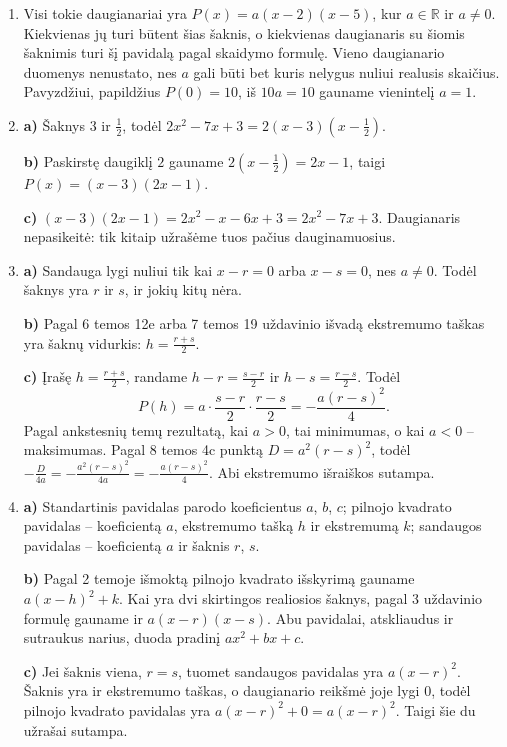 \documentclass[12pt,a4paper]{article}
\begin{document}
\begin{enumerate}
\textbf{c)} Įrašius $-1$ ar $3$ vienas dauginamasis tampa nuliu; $P(0)=-6$. Kiekvienas sąlygas tenkinantis daugianaris turi a dalies pavidalą, o iš $P(0)$ gauname tik vieną galimą reikšmę $a=2$, todėl kito daugianario nėra.
\item Visi tokie daugianariai yra $P(x)=a(x-2)(x-5)$, kur $a\in\mathbb R$ ir $a\ne0$. Kiekvienas jų turi būtent šias šaknis, o kiekvienas daugianaris su šiomis šaknimis turi šį pavidalą pagal skaidymo formulę. Vieno daugianario duomenys nenustato, nes $a$ gali būti bet kuris nelygus nuliui realusis skaičius. Pavyzdžiui, papildžius $P(0)=10$, iš $10a=10$ gauname vienintelį $a=1$.
\item \textbf{a)} Šaknys $3$ ir $\frac{1}{2}$, todėl $2x^2-7x+3=2(x-3)\left(x-\frac{1}{2}\right)$.

\textbf{b)} Paskirstę daugiklį $2$ gauname $2\left(x-\frac{1}{2}\right)=2x-1$, taigi $P(x)=(x-3)(2x-1)$.

\textbf{c)} $(x-3)(2x-1)=2x^2-x-6x+3=2x^2-7x+3$. Daugianaris nepasikeitė: tik kitaip užrašėme tuos pačius dauginamuosius.
\item \textbf{a)} Sandauga lygi nuliui tik kai $x-r=0$ arba $x-s=0$, nes $a\ne0$. Todėl šaknys yra $r$ ir $s$, ir jokių kitų nėra.

\textbf{b)} Pagal 6 temos 12e arba 7 temos 19 uždavinio išvadą ekstremumo taškas yra šaknų vidurkis: $h=\frac{r+s}{2}$.

\textbf{c)} Įrašę $h=\frac{r+s}{2}$, randame $h-r=\frac{s-r}{2}$ ir $h-s=\frac{r-s}{2}$. Todėl
\[P(h)=a\cdot\frac{s-r}{2}\cdot\frac{r-s}{2}=-\frac{a(r-s)^2}{4}.\]
Pagal ankstesnių temų rezultatą, kai $a>0$, tai minimumas, o kai $a<0$ – maksimumas. Pagal 8 temos 4c punktą $D=a^2(r-s)^2$, todėl $-\frac{D}{4a}=-\frac{a^2(r-s)^2}{4a}=-\frac{a(r-s)^2}{4}$. Abi ekstremumo išraiškos sutampa.
\item \textbf{a)} Standartinis pavidalas parodo koeficientus $a$, $b$, $c$; pilnojo kvadrato pavidalas – koeficientą $a$, ekstremumo tašką $h$ ir ekstremumą $k$; sandaugos pavidalas – koeficientą $a$ ir šaknis $r$, $s$.

\textbf{b)} Pagal 2 temoje išmoktą pilnojo kvadrato išskyrimą gauname $a(x-h)^2+k$. Kai yra dvi skirtingos realiosios šaknys, pagal 3 uždavinio formulę gauname ir $a(x-r)(x-s)$. Abu pavidalai, atskliaudus ir sutraukus narius, duoda pradinį $ax^2+bx+c$.

\textbf{c)} Jei šaknis viena, $r=s$, tuomet sandaugos pavidalas yra $a(x-r)^2$. Šaknis yra ir ekstremumo taškas, o daugianario reikšmė joje lygi $0$, todėl pilnojo kvadrato pavidalas yra $a(x-r)^2+0=a(x-r)^2$. Taigi šie du užrašai sutampa.


\end{enumerate}
\end{document}
